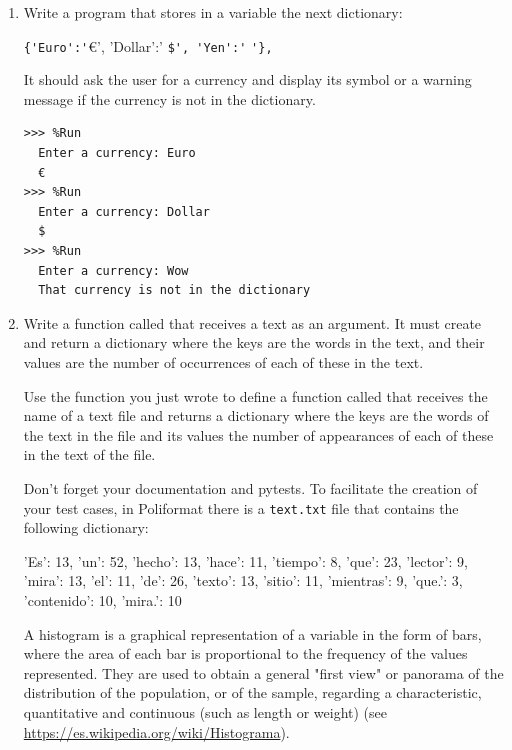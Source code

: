 \documentclass[
  fontsize=10pt,
  a4paper,
]{scrartcl}
\begin{document}
\begin{enumerate}

\item Write a program that stores in a variable the next dictionary:

\verb!{'Euro':'!\euro', 'Dollar':'
\verb!$', 'Yen':'!\yen
\verb!'},! 

It should ask the user for a currency and display its symbol or a warning message if the currency is not in the dictionary.

\begin{Verbatim}[frame=single, label = {\em example test runs}]
>>> %Run 
  Enter a currency: Euro
  €
>>> %Run 
  Enter a currency: Dollar
  $
>>> %Run 
  Enter a currency: Wow
  That currency is not in the dictionary
\end{Verbatim}



\item Write a function called  that receives a text as an argument. It must create and return a dictionary where the keys are the words in the text, and their values are the number of occurrences of each of these in the text.

Use the function you just wrote to define a function called  that receives the name of a text file and returns a dictionary where the keys are the words of the text in the file and its values the number of appearances of each of these in the text of the file.

Don't forget your documentation and pytests. To facilitate the creation of your test cases, in Poliformat there is a \texttt{text.txt} file that contains the following dictionary:


\begin{python}
{'Es': 13, 
 'un': 52, 
 'hecho': 13, 
 'hace': 11, 
 'tiempo': 8, 
 'que': 23, 
 'lector': 9, 
 'mira': 13, 
 'el': 11, 
 'de': 26, 
 'texto': 13, 
 'sitio': 11, 
 'mientras': 9, 
 'que.': 3, 
 'contenido': 10, 
 'mira.': 10
}
\end{python}
 
A histogram is a graphical representation of a variable in the form of bars, where the area of each bar is proportional to the frequency of the values represented. They are used to obtain a general "first view" or panorama of the distribution of the population, or of the sample, regarding a characteristic, quantitative and continuous (such as length or weight) (see \url{https://es.wikipedia.org/wiki/Histograma}).


\end{enumerate}
\end{document}

